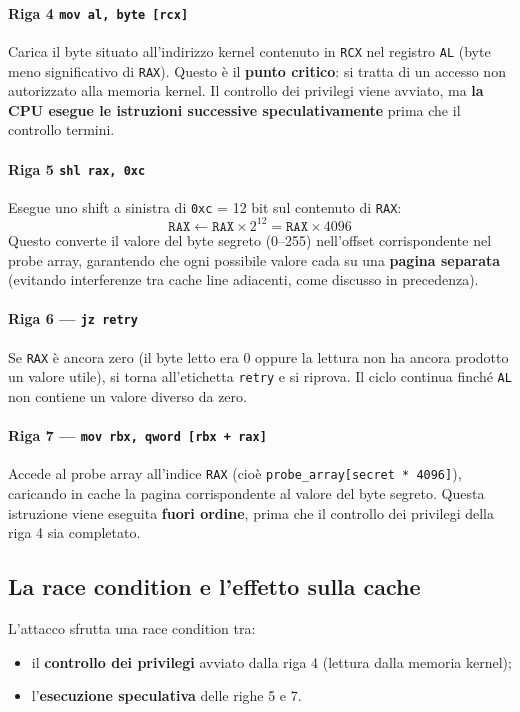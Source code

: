 \documentclass{article}
\begin{document}
\paragraph{Riga 4 \texttt{mov al, byte [rcx]}}
Carica il byte situato all'indirizzo kernel contenuto in \texttt{RCX} 
nel registro \texttt{AL} (byte meno significativo di \texttt{RAX}). 
Questo è il \textbf{punto critico}: si tratta di un accesso non 
autorizzato alla memoria kernel. Il controllo dei privilegi viene 
avviato, ma \textbf{la CPU esegue le istruzioni successive 
speculativamente} prima che il controllo termini.

\paragraph{Riga 5 \texttt{shl rax, 0xc}}
Esegue uno shift a sinistra di \texttt{0xc} = 12 bit sul contenuto 
di \texttt{RAX}:
\[
    \texttt{RAX} \leftarrow \texttt{RAX} \times 2^{12} 
    = \texttt{RAX} \times 4096
\]
Questo converte il valore del byte segreto (0--255) nell'offset 
corrispondente nel probe array, garantendo che ogni possibile valore 
cada su una \textbf{pagina separata} (evitando interferenze tra 
cache line adiacenti, come discusso in precedenza).

\paragraph{Riga 6 --- \texttt{jz retry}}
Se \texttt{RAX} è ancora zero (il byte letto era 0 oppure la lettura 
non ha ancora prodotto un valore utile), si torna all'etichetta 
\texttt{retry} e si riprova. Il ciclo continua finché \texttt{AL} 
non contiene un valore diverso da zero.

\paragraph{Riga 7 --- \texttt{mov rbx, qword [rbx + rax]}}
Accede al probe array all'indice \texttt{RAX} (cioè 
\texttt{probe\_array[secret * 4096]}), caricando in cache la pagina 
corrispondente al valore del byte segreto. Questa istruzione viene 
eseguita \textbf{fuori ordine}, prima che il controllo dei privilegi 
della riga 4 sia completato.

\subsection*{La race condition e l'effetto sulla cache}

L'attacco sfrutta una race condition tra:
\begin{itemize}
    \item il \textbf{controllo dei privilegi} avviato dalla riga 4 
    (lettura dalla memoria kernel);
    \item l'\textbf{esecuzione speculativa} delle righe 5 e 7.
\end{itemize}
\end{document}
